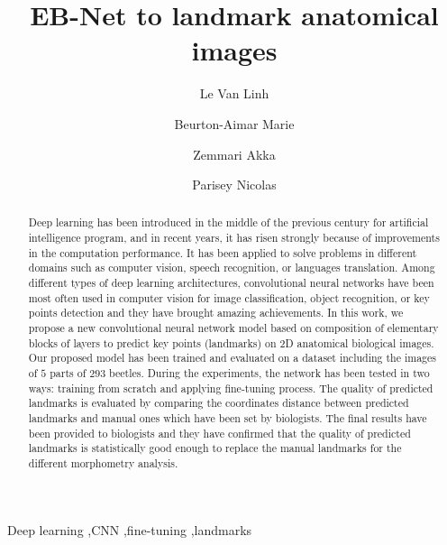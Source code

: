 \documentclass[review]{elsarticle}
\begin{document}
\begin{frontmatter}

\title{EB-Net to landmark anatomical images}


\author[labri,itdlu]{Le Van Linh}
\author[labri]{Beurton-Aimar Marie}
\author[labri]{Zemmari Akka}
\author[igepp]{Parisey Nicolas}


\address[labri]{University of Bordeaux, 351, cours de la Libération, 33405 Talence, France}

\address[igepp]{UMR 1349 IGEPP, BP 35327, 35653 Le Rheu, France}
\address[itdlu]{Dalat University, Dalat, Lamdong, Vietnam}

\begin{abstract}
Deep learning has been introduced in the middle of the previous century for artificial intelligence program, and in recent years, it has risen strongly because of improvements in the computation performance. It has been applied to solve problems in different domains such as computer vision, speech recognition, or languages translation. Among different types of deep learning architectures, convolutional neural networks have been most often used in computer vision for image classification, object recognition, or key points detection and they have brought amazing achievements. In this work, we propose a new convolutional neural network model based on composition of elementary blocks of layers to predict key points (landmarks) on 2D anatomical biological images. Our proposed model has been trained and evaluated on a dataset including the images of $5$ parts of $293$ beetles. During the experiments, the network has been tested in two ways: training from scratch and applying fine-tuning process. The quality of predicted landmarks is evaluated by comparing the coordinates distance between predicted landmarks and manual ones which have been set by biologists. The final results have been provided to biologists and they have confirmed that the quality of predicted landmarks is statistically good enough to replace the manual landmarks for the different morphometry analysis.
\end{abstract}

\begin{keyword}
Deep learning \sep CNN \sep fine-tuning \sep landmarks
\end{keyword}

\end{frontmatter}
\end{document}
